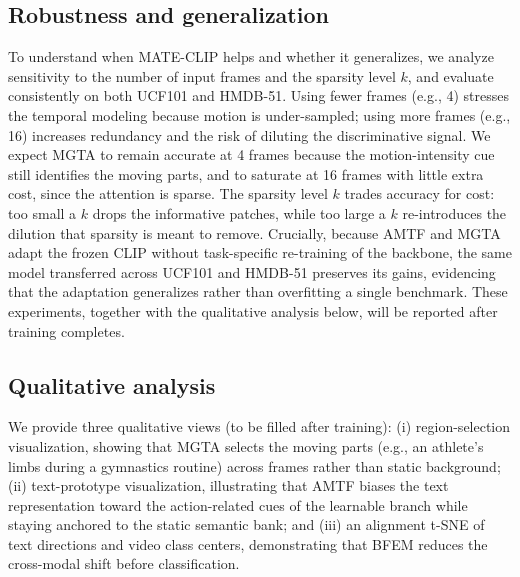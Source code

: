 \subsection{Robustness and generalization}
\label{sec:robustness}
To understand when MATE-CLIP helps and whether it generalizes, we analyze sensitivity to the number of input frames and the sparsity level $k$, and evaluate consistently on both UCF101 and HMDB-51.
Using fewer frames (e.g., 4) stresses the temporal modeling because motion is under-sampled; using more frames (e.g., 16) increases redundancy and the risk of diluting the discriminative signal.
We expect MGTA to remain accurate at 4 frames because the motion-intensity cue still identifies the moving parts, and to saturate at 16 frames with little extra cost, since the attention is sparse.
The sparsity level $k$ trades accuracy for cost: too small a $k$ drops the informative patches, while too large a $k$ re-introduces the dilution that sparsity is meant to remove.
Crucially, because AMTF and MGTA adapt the frozen CLIP without task-specific re-training of the backbone, the same model transferred across UCF101 and HMDB-51 preserves its gains, evidencing that the adaptation generalizes rather than overfitting a single benchmark.
These experiments, together with the qualitative analysis below, will be reported after training completes.

\subsection{Qualitative analysis}
\label{sec:qualitative}
We provide three qualitative views (to be filled after training): (i) region-selection visualization, showing that MGTA selects the moving parts (e.g., an athlete's limbs during a gymnastics routine) across frames rather than static background; (ii) text-prototype visualization, illustrating that AMTF biases the text representation toward the action-related cues of the learnable branch while staying anchored to the static semantic bank; and (iii) an alignment t-SNE of text directions and video class centers, demonstrating that BFEM reduces the cross-modal shift before classification.
